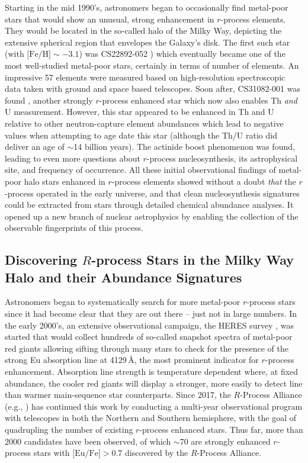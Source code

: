 \documentclass[letterpaper]{article}
\begin{document}
Starting in the mid 1990's, astronomers began to occasionally find metal-poor stars that would show an unusual, strong enhancement in $r$-process elements. They would be located in the so-called halo of the Milky Way, depicting the extensive spherical region that envelopes the Galaxy's disk. The first such star (with $\mbox{[Fe/H]}\sim-3.1$) was CS22892-052 \citep{sneden1994,Sneden03}) which eventually became one of the most well-studied metal-poor stars, certainly in terms of number of elements. An impressive 57 elements were measured based on high-resolution spectroscopic data taken with ground and space based telescopes. Soon after, CS31082-001 was found \citep{Cayrel01, Hill02}, another strongly $r$-process enhanced star which now also enables Th \textit{and} U measurement. However, this star appeared to be enhanced in Th and U relative to other neutron-capture element abundances which lead to negative values when attempting to age date this star (although the Th/U ratio did deliver an age of $\sim$14 billion years). The actinide boost phenomenon was found, leading to even more questions about $r$-process nucleosynthesis, its astrophysical site, and frequency of occurrence.
% 
All these initial observational findings of metal-poor halo stars enhanced in $r$-process elements showed without a doubt \textit{that} the $r$-process operated in the early universe, and that clean nucleosynthesis signatures could be extracted from stars through detailed chemical abundance analyses. It opened up a new branch of nuclear astrophysics by enabling the collection of the observable fingerprints of this process.
 
 
\subsection{Discovering $R$-process Stars in the Milky Way Halo and their Abundance Signatures}

Astronomers began to systematically search for more metal-poor $r$-process stars since it had become clear that they are out there -- just not in large numbers. 
In the early 2000's, an extensive observational campaign, the HERES survey \citep{Christlieb04, Barklem2005}, was started that would collect hundreds of so-called snapshot spectra of metal-poor red giants allowing sifting through many stars to check for the presence of the strong Eu absorption line at 4129\,{\AA}, the most prominent indicator for $r$-process enhancement. Absorption line strength is temperature dependent where, at fixed abundance, the cooler red giants will display a stronger, more easily to detect line than warmer main-sequence star counterparts. Since 2017, the $R$-Process Alliance (e.g., \citealt{sakari18,hansen18,ezzeddine20, holmbeck20}) has continued this work by conducting a multi-year observational program with telescopes in both the Northern and Southern hemisphere, with the goal of quadrupling the number of existing $r$-process enhanced stars. Thus far, more than 2000 candidates have been observed, of which $\sim$70 are strongly enhanced $r$-process stars with $\mbox{[Eu/Fe]}>0.7$ discovered by the $R$-Process Alliance. 
\end{document}
